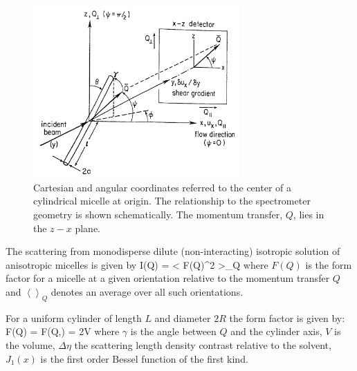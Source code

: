 \begin{figure}[htb]
\begin{center}
\includegraphics[width=0.7\textwidth]{shear_cuette_SANS_geometry.png}
\end{center}
\caption{Cartesian and angular coordinates referred to the center
of a cylindrical micelle at origin. The relationship to the
spectrometer geometry is shown schematically. The momentum
transfer, $Q$, lies in the $z-x$ plane.}
\label{shear_cuette_SANS_geometry}
\end{figure}

The scattering from monodisperse dilute (non-interacting)
isotropic solution of anisotropic micelles is given by \BE I(Q) =
\left< \vert F(Q)\vert^2 \right>_Q \label{IQ_av} \EE where $F(Q)$
is the form factor for a micelle at a given orientation relative
to the momentum transfer $Q$ and $\left<\right>_Q$ denotes an
average over all such orientations.

For a uniform cylinder of length $L$ and diameter $2R$ the form
factor is given by:
\BE F(Q) = F(Q,\gamma) = 2\Delta\eta V
\EE
where $\gamma$ is the
angle between $Q$ and the cylinder axis, $V$ is the volume,
$\Delta\eta$ the scattering length density contrast relative to
the solvent, $J_1(x)$ is the first order Bessel function of the
first kind.

